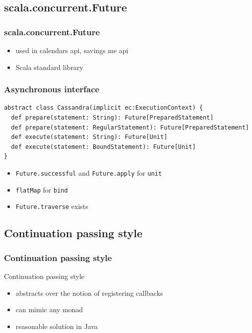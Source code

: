 \documentclass{beamer}
\begin{document}
\subsection{scala.concurrent.Future}
\begin{frame}
\frametitle{scala.concurrent.Future}
\begin{itemize}
\item used in calendars api, savings me api
\item Scala standard library
\end{itemize}
\end{frame}

\begin{frame}[fragile]
\frametitle{Asynchronous interface}
\begin{lstlisting}
abstract class Cassandra(implicit ec:ExecutionContext) {
  def prepare(statement: String): Future[PreparedStatement]
  def prepare(statement: RegularStatement): Future[PreparedStatement]
  def execute(statement: String): Future[Unit]
  def execute(statement: BoundStatement): Future[Unit]
}
\end{lstlisting}
\begin{itemize}
\item \verb|Future.successful| and \verb|Future.apply| for \verb|unit|
\item \verb|flatMap| for \verb|bind|
\item \verb|Future.traverse| exists
\end{itemize}
\end{frame}

\subsection{Continuation passing style}
\begin{frame}
\frametitle{Continuation passing style}
Continuation passing style
\begin{itemize}
\item abstracts over the notion of registering callbacks
\item can mimic any monad
\item reasonable solution in Java
\end{itemize}
\end{frame}
\end{document}
